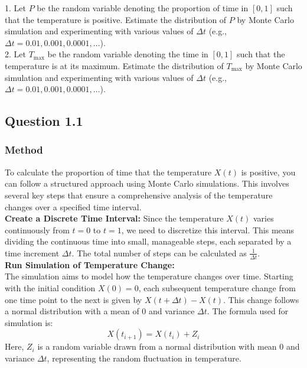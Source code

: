 \documentclass{article}
\begin{document}
1. Let \(P\) be the random variable denoting the proportion of time in \([0,1]\) such that the temperature is positive. Estimate the distribution of \(P\) by Monte Carlo simulation and experimenting with various values of \(\Delta t\) (e.g., \(\Delta t=0.01, 0.001, 0.0001, \ldots\)).\\

2. Let \(T_{\max}\) be the random variable denoting the time in \([0,1]\) such that the temperature is at its maximum. Estimate the distribution of \(T_{\max}\) by Monte Carlo simulation and experimenting with various values of \(\Delta t\) (e.g., \(\Delta t=0.01, 0.001, 0.0001, \ldots\)).

\subsection*{Question 1.1}

\subsubsection*{Method}
To calculate the proportion of time that the temperature \(X(t)\) is positive, you can follow a structured approach using Monte Carlo simulations. This involves several key steps that ensure a comprehensive analysis of the temperature changes over a specified time interval.\\

\textbf{Create a Discrete Time Interval:}
Since the temperature \(X(t)\) varies continuously from \(t = 0\) to \(t = 1\), we need to discretize this interval. This means dividing the continuous time into small, manageable steps, each separated by a time increment \(\Delta t\). The total number of steps can be calculated as \(\frac{1}{\Delta t}\).\\

\textbf{Run Simulation of Temperature Change:} \\
The simulation aims to model how the temperature changes over time. Starting with the initial condition \(X(0) = 0\), each subsequent temperature change from one time point to the next is given by \(X(t + \Delta t) - X(t)\). This change follows a normal distribution with a mean of 0 and variance \(\Delta t\). The formula used for simulation is:
\[
X(t_{i+1}) = X(t_i) + Z_i
\]
Here, \(Z_i\) is a random variable drawn from a normal distribution with mean 0 and variance \(\Delta t\), representing the random fluctuation in temperature.\\
\end{document}
